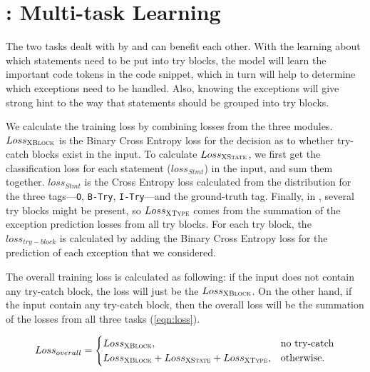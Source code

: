 \section{{\xtype}: Multi-task Learning}
\label{sec:multitasking}

The two tasks dealt with by {\xstate} and {\xtype} can benefit each other. With the learning about which statements need to be put into try blocks, the model will learn the important code tokens in the code snippet, which in turn will help to determine which exceptions need to be handled. Also, knowing the exceptions will give strong hint to the way that statements should be grouped into try blocks.

We calculate the training loss by combining losses from the three modules. $Loss_{{\textsc{XBlock}}}$ is the Binary Cross Entropy loss for the decision as to whether try-catch blocks exist in the input. To calculate $Loss_{{\textsc{XState}}}$, we first get the classification loss for each statement ($loss_{Stmt}$) in the input, and sum them together. $loss_{Stmt}$ is the Cross Entropy loss calculated from the distribution for the three tags---\texttt{O}, \texttt{B-Try}, \texttt{I-Try}---and the ground-truth tag. Finally, in \xtype, several try blocks might be present, so $Loss_{{\textsc{XType}}}$ comes from the summation of the exception prediction losses from all try blocks. For each try block, the $loss_{try-block}$ is calculated by adding the Binary Cross Entropy loss for the prediction of each exception that we considered. 

The overall training loss is calculated as following: if the input does not contain any try-catch block, the loss will just be the $Loss_{{\textsc{XBlock}}}$. On the other hand, if the input contain any try-catch block, then the overall loss will be the summation of the losses from all three tasks (\ref{eqn:loss}). 

\begin{equation}
\label{eqn:loss}
Loss_{overall} =
\begin{cases}
Loss_{{\textsc{XBlock}}},  & \text{no try-catch}\\
Loss_{{\textsc{XBlock}}} + Loss_{{\textsc{XState}}} + Loss_{{\textsc{XType}}}, &\text{otherwise.}
\end{cases}
\end{equation}